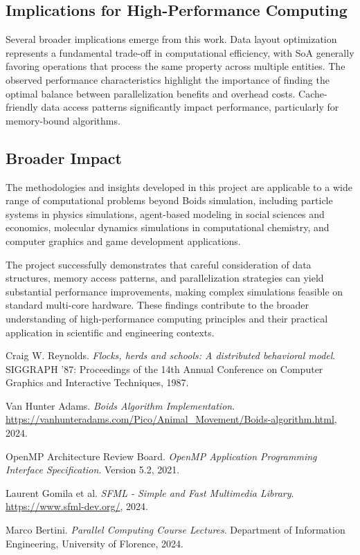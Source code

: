 \documentclass[10pt,twocolumn,letterpaper]{article}
\begin{document}
\subsection{Implications for High-Performance Computing}

Several broader implications emerge from this work. Data layout optimization represents a fundamental trade-off in computational efficiency, with SoA generally favoring operations that process the same property across multiple entities. The observed performance characteristics highlight the importance of finding the optimal balance between parallelization benefits and overhead costs. Cache-friendly data access patterns significantly impact performance, particularly for memory-bound algorithms.

\subsection{Broader Impact}

The methodologies and insights developed in this project are applicable to a wide range of computational problems beyond Boids simulation, including particle systems in physics simulations, agent-based modeling in social sciences and economics, molecular dynamics simulations in computational chemistry, and computer graphics and game development applications.

The project successfully demonstrates that careful consideration of data structures, memory access patterns, and parallelization strategies can yield substantial performance improvements, making complex simulations feasible on standard multi-core hardware. These findings contribute to the broader understanding of high-performance computing principles and their practical application in scientific and engineering contexts.

{\small
\begin{thebibliography}{99}

Craig W. Reynolds.
\textit{Flocks, herds and schools: A distributed behavioral model}.
SIGGRAPH '87: Proceedings of the 14th Annual Conference on Computer Graphics and Interactive Techniques, 1987.

Van Hunter Adams.
\textit{Boids Algorithm Implementation}.
\url{https://vanhunteradams.com/Pico/Animal_Movement/Boids-algorithm.html}, 2024.

OpenMP Architecture Review Board.
\textit{OpenMP Application Programming Interface Specification}.
Version 5.2, 2021.

Laurent Gomila et al.
\textit{SFML - Simple and Fast Multimedia Library}.
\url{https://www.sfml-dev.org/}, 2024.

Marco Bertini.
\textit{Parallel Computing Course Lectures}.
Department of Information Engineering, University of Florence, 2024.

\end{thebibliography}
}
\end{document}
